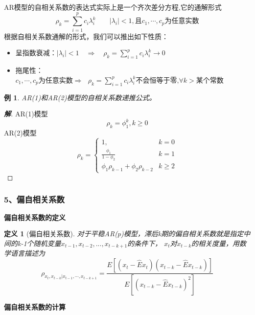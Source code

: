 \documentclass[12pt, a4paper, oneside]{ctexbook}
\newtheorem{definition}[theorem]{定义}
\newtheorem{example}[theorem]{例}
\newcommand\jie[2]{\begin{proof}[\textbf{#1}]
    #2
\end{proof}}
\begin{document}
AR模型的自相关系数的表达式实际上是一个齐次差分方程,它的通解形式
\begin{equation*}
    \rho_k=\sum_{i=1}^pc_i\lambda_i^k\quad\quad|\lambda_i|<1,\text{且}c_1,\cdots,c_p\text{为任意实数}
\end{equation*}
根据自相关系数通解的形式，我们可以推出如下性质：
\begin{itemize}
    \item 呈指数衰减：$|\lambda_i|<1\quad\Rightarrow\quad\rho_k=\sum_{i=1}^pc_i\lambda_i^k\to0$
    \item 拖尾性：$c_1,\cdots,c_p\text{为任意实数}\Rightarrow\textbf{ }\rho_k=
              \sum_{i=1}^pc_i\lambda_i^k\text{不会恒等于零,}\forall k>\text{某个常数}$
\end{itemize}

\begin{example}
    AR(1)和AR(2)模型的自相关系数递推公式。
\end{example}
\jie{解}{
    AR(1)模型
    \begin{equation*}
        \rho_k=\phi_1^k,k\geq0
    \end{equation*}
    AR(2)模型
    \begin{equation*}
        \rho_k=\begin{cases}
            1,                                & k=0    \\
            \frac{\phi_1}{1-\phi_2}           & k=1    \\
            \phi_1\rho_{k-1}+\phi_2\rho_{k-2} & k\geq2
        \end{cases}
    \end{equation*}
}

\subsubsection{5、偏自相关系数}
\textbf{偏自相关系数的定义}

\begin{definition}[偏自相关系数]
    对于平稳AR(p)模型，滞后k期的偏自相关系数就是指定中间的k-1个随机变量$x_{t-1},x_{t-2},...,x_{t-k+1}$的条件下，
    $x_t$对$x_{t-k}$的相关度量，用数学语言描述为
    \begin{equation}
        \rho_{x_t,x_{t-k}|x_{t-1},\cdots,x_{t-k+1}}
        =\frac{E[(x_t-\hat{E}x_t)(x_{t-k}-\hat{E}x_{t-k})]}
        {E[(x_{t-k}-\hat{E}x_{t-k})^2]}
    \end{equation}
\end{definition}

\textbf{偏自相关系数的计算}
\end{document}
